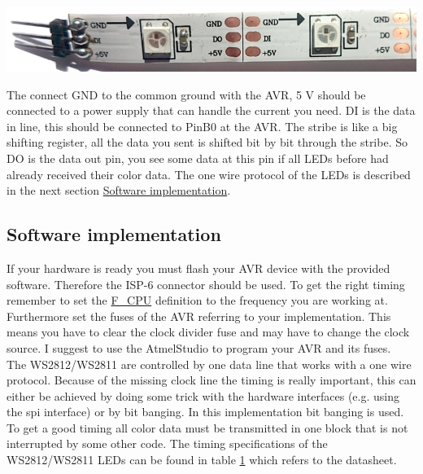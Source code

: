 \begin{DoxyImage}
\includegraphics[width=\textwidth,height=\textheight/2,keepaspectratio=true]{WS2812.png}
\caption{W\+S2812 stribe with pin header}
\end{DoxyImage}
  The connect G\+N\+D to the common ground with the A\+V\+R, 5 V should be connected to a power supply that can handle the current you need. D\+I is the data in line, this should be connected to Pin\+B0 at the A\+V\+R. The stribe is like a big shifting register, all the data you sent is shifted bit by bit through the stribe. So D\+O is the data out pin, you see some data at this pin if all L\+E\+Ds before had already received their color data. The one wire protocol of the L\+E\+Ds is described in the next section \hyperlink{index_software_sec}{Software implementation}.\hypertarget{index_software_sec}{}\subsection{Software implementation}\label{index_software_sec}
If your hardware is ready you must flash your A\+V\+R device with the provided software. Therefore the I\+S\+P-\/6 connector should be used. To get the right timing remember to set the \hyperlink{globals_8h_a43bafb28b29491ec7f871319b5a3b2f8}{F\+\_\+\+C\+P\+U} definition to the frequency you are working at. Furthermore set the fuses of the A\+V\+R referring to your implementation. This means you have to clear the clock divider fuse and may have to change the clock source. I suggest to use the Atmel\+Studio to program your A\+V\+R and its fuses. ~\newline
 The W\+S2812/\+W\+S2811 are controlled by one data line that works with a one wire protocol. Because of the missing clock line the timing is really important, this can either be achieved by doing some trick with the hardware interfaces (e.\+g. using the spi interface) or by bit banging. In this implementation bit banging is used. To get a good timing all color data must be transmitted in one block that is not interrupted by some other code. The timing specifications of the W\+S2812/\+W\+S2811 L\+E\+Ds can be found in table \hyperlink{index_timingtable}{1} which refers to the datasheet.~\newline


